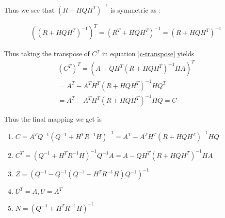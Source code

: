 \documentclass{tufte-handout}
\begin{document}
Thus we see that $(R + HQH^T)^{-1}$ is symmetric as : 

\begin{multline}
   ((R + HQH^T)^{-1} )^T =  (R^T + HQH^T)^{-1} = (R + HQH^T)^{-1}
\end{multline}

Thus taking  the transpose of  $C^T$ in equation \ref{c-transpose} yields 
\begin{multline}
   (C^T)^T = (A - QH^T (R + HQH^T)^{-1} H A)^T  \\
   = A^T - A^T H^T ( R +   HQH^T)^{-1} H Q^T \\ 
   =A^T - A^T H^T ( R +   HQH^T)^{-1} H Q  = C
\end{multline}

Thus the final mapping we get is 

\begin{enumerate}
    \item $C = A^TQ^{-1}(Q^{-1} + H^T R^{-1}H)^{-1} = A^T - A^T H^T ( R +   HQH^T)^{-1} H Q  $
    \item $C^T = (Q^{-1} + H^T R^{-1}H)^{-1}Q^{-1}A = A - QH^T (R + HQH^T)^{-1} H A$
    \item $Z  = (Q^{-1} - Q^{-1}(Q^{-1}  + H^TR^{-1}H) Q^{-1})^{-1} $
    \item $U^T = A, U = A^T$
    \item $N  = (Q^{-1} + H^TR^{-1}H)^{-1}$
\end{enumerate}



\end{document}
